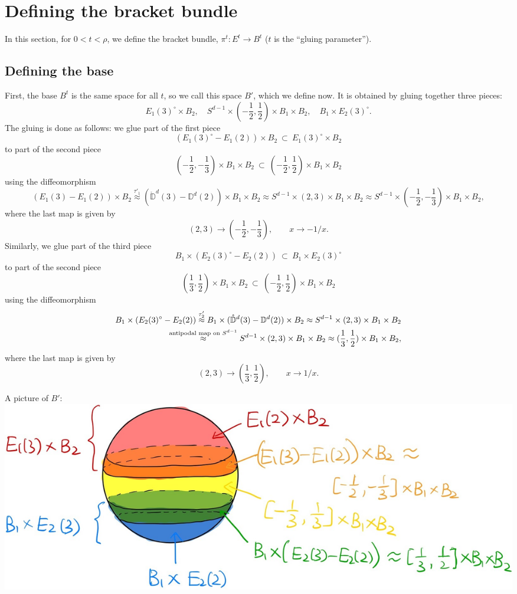 \documentclass[11pt]{article}
\theoremstyle{definition}
\theoremstyle{remark}
\def\mr#1{{\mathring{#1}}}
\def\D{\mathbb{D}}
\def\tn#1{\textnormal{#1}}
\begin{document}
\section{Defining the bracket bundle}

In this section, for $0<t<\rho$, we define the bracket bundle, $\pi^t:E^t\to B^t$ ($t$ is the ``gluing parameter''). 

\subsection{Defining the base}\label{Bt_sec}
First, the base $B^t$ is the same space for all $t$, so we call this space $B'$, which we define now. 
It is obtained by gluing together three pieces: \begin{equation}\label{piecesB_eqn}
{E_1(3)^\circ}\times B_2,\quad S^{d-1}\times (-\frac{1}{2},\frac{1}{2})\times B_1\times B_2,\quad B_1\times {E_2(3)^\circ}.
\end{equation}
The gluing is done as follows: 
we glue part of the first piece 
$$({E_1(3)^\circ}-E_1(2))\times B_2 \ \subset\  E_1(3)^\circ\times B_2$$
to part of the second piece 
$$(-\frac{1}{2},-\frac{1}{3})\times B_1\times B_2\ \subset\  (-\frac{1}{2},\frac{1}{2})\times B_1\times B_2$$
using the diffeomorphism
$$(E_1(3)-E_1(2))\times B_2\stackrel{\tau'_1}{\approx} (\mr\D^d(3)-\D^d(2))\times B_1\times B_2\approx S^{d-1}\times(2,3)\times B_1\times B_2\approx S^{d-1}\times(-\frac{1}{2},-\frac{1}{3})\times B_1\times B_2,$$
where the last map is given by 
$$(2,3)\to(-\frac{1}{2},-\frac{1}{3}),\qquad x\to -1/x.$$
Similarly, we glue part of the third piece 
$$B_1\times(E_2(3)^\circ-E_2(2))\ \subset\ B_1\times E_2(3)^\circ$$
to part of the second piece 
$$(\frac{1}{3},\frac{1}{2})\times B_1\times B_2\ \subset\  (-\frac{1}{2},\frac{1}{2})\times B_1\times B_2$$
using the diffeomorphism 
\begin{align*}
B_1\times(E_2(3)^\circ-E_2(2))\stackrel{\tau'_2}{\approx}B_1\times(\mr\D^d(3)-\D^d(2))\times B_2\approx S^{d-1}\times(2,3)\times B_1\times B_2\\
\stackrel{\tn{antipodal map on }S^{d-1}}{\approx}S^{d-1}\times(2,3)\times B_1\times B_2\approx(\frac{1}{3},\frac{1}{2})\times B_1\times B_2,
\end{align*}
where the last map is given by 
$$(2,3)\to(\frac{1}{3},\frac{1}{2}),\qquad x\to 1/x.$$

A picture of $B'$: 
\includegraphics[scale=0.18]{fig2_fig}
\end{document}
